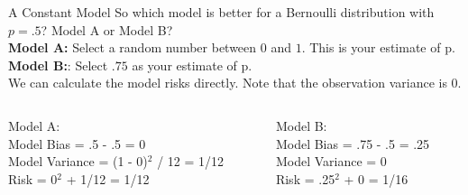 \documentclass[aspectratio=169]{../latex_main/tntbeamer}  %
\begin{document}
	
	\begin{frame}[c]{A Constant Model}
	    So which model is better for a Bernoulli distribution with $p=.5$? Model A or Model B?\\
	    \bigskip
	    \textbf{Model A:} Select a random number between $0$ and $1$. This is your estimate of p.\\
        \textbf{Model B:}: Select $.75$ as your estimate of p.\\
        \bigskip
        We can calculate the model risks directly. Note that the observation variance is 0.
        \begin{columns}
            \begin{column}{.4\textwidth}
                  Model A:\\
                  \bigskip
                  Model Bias = .5 - .5 = 0\\
                  Model Variance = (1 - 0)$^2$ / 12 = 1/12\\
                  \bigskip
                  Risk = 0$^2$ + 1/12 = 1/12
            \end{column}
            
            
            \begin{column}{.4\textwidth}
                   Model B:\\
                  \bigskip
                  Model Bias = .75 - .5 = .25\\
                  Model Variance = 0\\

                  \bigskip
                  Risk = .25$^2$ + 0 = 1/16
 
            \end{column}
        \end{columns}

	\end{frame}
\end{document}
